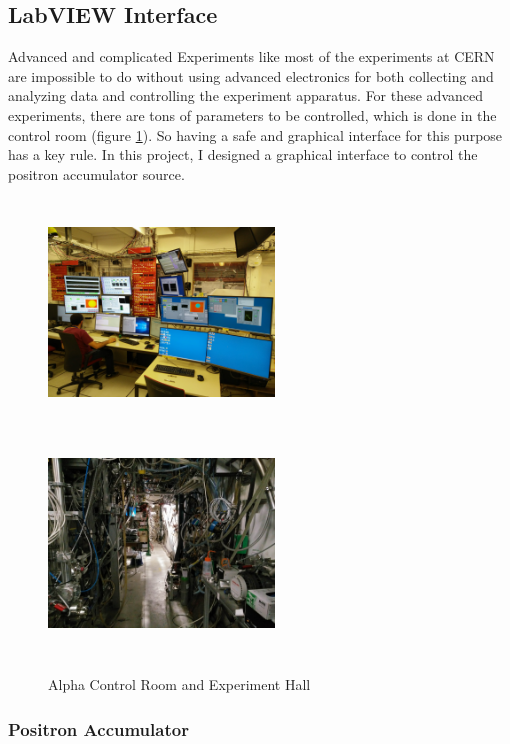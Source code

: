 \documentclass[12pt,a4paper]{article}
\begin{document}
\newpage


\subsection{LabVIEW Interface}

Advanced and complicated Experiments like most of the experiments at CERN are impossible to do without using advanced electronics for both collecting and analyzing data and controlling the experiment apparatus. For these advanced experiments, there are tons of parameters to be controlled, which is done in the control room (figure \ref{control}). 
So having a safe and graphical interface for this purpose has a key rule. In this project, I designed a graphical interface to control the positron accumulator source.

\begin{figure}[h]
\centering
\includegraphics[width=60mm, height=60mm]{control_room}
\includegraphics[width=60mm, height=60mm]{experiment_hall}
\caption{Alpha Control Room and Experiment Hall}
\label{control}
\end{figure}




\subsubsection{Positron Accumulator}
\end{document}
